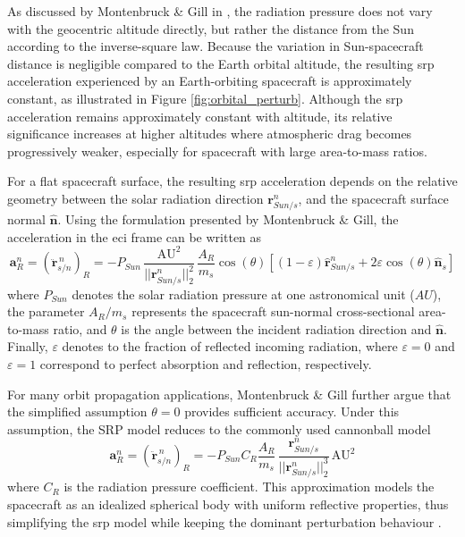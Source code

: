 As discussed by Montenbruck \& Gill in \cite{montenbruck2000}, the radiation pressure does not vary with the geocentric altitude directly, but rather the distance from the Sun according to the inverse-square law. Because the variation in Sun-spacecraft distance is negligible compared to the Earth orbital altitude, the resulting \gls{srp} acceleration experienced by an Earth-orbiting spacecraft is approximately constant, as illustrated in Figure \ref{fig:orbital_perturb}. Although the \gls{srp} acceleration remains approximately constant with altitude, its relative significance increases at higher altitudes where atmospheric drag becomes progressively weaker, especially for spacecraft with large area-to-mass ratios. 


For a flat spacecraft surface, the resulting \gls{srp} acceleration depends on the relative geometry between the solar radiation direction $\textbf{r}^n_{Sun/s}$, and the spacecraft surface normal $\hat{\textbf{n}}$. Using the formulation presented by Montenbruck \& Gill, the acceleration in the \gls{eci} frame can be written as
\begin{equation}
    \textbf{a}_{R}^n = \left(\ddot{\mathbf{r}}_{s/n}^{\,n}\right)_{R} = -P_{Sun} \, \frac{\text{AU}^2}{||\textbf{r}_{Sun/s}^{n}||_2^2} \, \frac{A_R}{m_s} \cos(\theta)\left[(1-\varepsilon) \hat{\textbf{r}}_{Sun/s}^n + 2\varepsilon \cos(\theta)\hat{\mathbf{n}}_s\right]
\label{eq:srp_extended}
\end{equation} %
where $P_{Sun}$ denotes the solar radiation pressure at one astronomical unit ($AU$), the parameter $A_R/m_s$ represents the spacecraft sun-normal cross-sectional area-to-mass ratio, and $\theta$ is the angle between the incident radiation direction and $\hat{\textbf{n}}$. Finally, $\varepsilon$ denotes to the fraction of reflected incoming radiation, where $\varepsilon=0$ and $\varepsilon=1$ correspond to perfect absorption and reflection, respectively.

For many orbit propagation applications, Montenbruck \& Gill further argue that the simplified assumption $\theta=0$ provides sufficient accuracy\cite{montenbruck2000}. Under this assumption, the SRP model reduces to the commonly used cannonball model
\begin{equation}
    \textbf{a}_{R}^n = \left(\ddot{\mathbf{r}}_{s/n}^{\,n}\right)_{R} = -P_{Sun} C_R \frac{A_R}{m_s} \, \frac{\textbf{r}_{Sun/s}^{n}}{||\textbf{r}_{Sun/s}^{n}||_2^3} \,\text{AU}^2
\end{equation}
where $C_R$ is the radiation pressure coefficient. This approximation models the spacecraft as an idealized spherical body with uniform reflective properties, thus simplifying the \gls{srp} model while keeping the dominant perturbation behaviour \cite{vallado2001fundamentals, hystad2025}.

